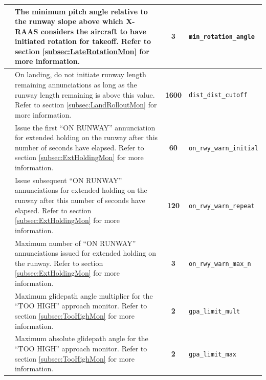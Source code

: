\documentclass[a4paper,12pt]{article}
\newcommand{\confopt}[1]{\texttt{#1}}
\begin{document}
{\begin{center}
\begin{supertabular}{|c|p{8cm}|c|l|}
\hline

 &
The minimum pitch angle relative to the runway slope above which X-RAAS
considers the aircraft to have initiated rotation for takeoff.\newline
Refer to section \ref{subsec:LateRotationMon} for more information. &
\textbf{3} & \confopt{min\_rotation\_angle} \\

\hline

 &
On landing, do not initiate runway length remaining annunciations as long
as the runway length remaining is above this value.\newline
Refer to section \ref{subsec:LandRolloutMon} for more information. &
\textbf{1600} & \confopt{dist\_dist\_cutoff} \\

\hline

 &
Issue the first ``ON RUNWAY'' annunciation for extended holding on the
runway after this number of seconds have elapsed.\newline
Refer to section \ref{subsec:ExtHoldingMon} for more information. &
\textbf{60} & \confopt{on\_rwy\_warn\_initial} \\

\hline

 &
Issue subsequent ``ON RUNWAY'' annunciations for extended holding on the
runway after this number of seconds have elapsed.\newline
Refer to section \ref{subsec:ExtHoldingMon} for more information. &
\textbf{120} & \confopt{on\_rwy\_warn\_repeat} \\

\hline

 &
Maximum number of ``ON RUNWAY'' annunciations issued for extended holding
on the runway.
Refer to section \ref{subsec:ExtHoldingMon} for more information. &
\textbf{3} & \confopt{on\_rwy\_warn\_max\_n} \\

\hline

 &
Maximum glidepath angle multiplier for the ``TOO HIGH'' approach
monitor.\newline
Refer to section \ref{subsec:TooHighMon} for more information. &
\textbf{2} & \confopt{gpa\_limit\_mult} \\

\hline

 &
Maximum absolute glidepath angle for the ``TOO HIGH'' approach
monitor.\newline
Refer to section \ref{subsec:TooHighMon} for more information. &
\textbf{2} & \confopt{gpa\_limit\_max} \\


\end{supertabular}
\end{center}}
\end{document}
